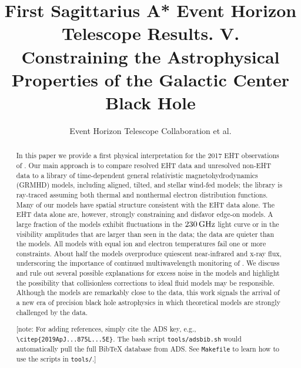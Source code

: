 \documentclass[twocolumn,twocolappendix,tighten,dvipsnames,linenumbers]{aastex63}
\newcommand\note[1]{{\color{OliveGreen}[note: #1]}}
\begin{document}
\title{First Sagittarius A* Event Horizon Telescope Results. V.\\
  Constraining the Astrophysical Properties of the Galactic Center Black Hole}

%
\author{Event Horizon Telescope Collaboration et al.}


\received{\today}
\revised{\today}

\begin{abstract}

In this paper we provide a first physical interpretation for the 2017
EHT observations of \sgra.
Our main approach is to compare resolved EHT data and unresolved
non-EHT data to a library of time-dependent general relativistic
magnetohydrodynamics (GRMHD) models, including aligned, tilted, and
stellar wind-fed models; the library is ray-traced assuming both
thermal and nonthermal electron distribution functions.
Many of our models have spatial structure consistent with the EHT data
alone.
The EHT data alone are, however, strongly constraining and disfavor
edge-on models.
A large fraction of the models exhibit fluctuations in the $230\,\mathrm{GHz}$
light curve or in the visibility amplitudes that are larger than seen
in the data; the data are quieter than the models.
All models with equal ion and electron temperatures fail one or more
constraints.
About half the models overproduce quiescent near-infrared and x-ray
flux, underscoring the importance of continued multiwavelength
monitoring of \sgra.
We discuss and rule out several possible explanations for excess noise
in the models and highlight the possibility that collisionless
corrections to ideal fluid models may be responsible.
Although the models are remarkably close to the data, this work
signals the arrival of a new era of precision black hole astrophysics
in which theoretical models are strongly challenged by the data.

\note{For adding references, simply cite the ADS key, e.g.,
  \texttt{\textbackslash citep\{2019ApJ...875L...5E\}}.
  The bash script \texttt{tools/adsbib.sh} would automatically pull
  the full BibTeX database from ADS.
  See \texttt{Makefile} to learn how to use the scripts in
  \texttt{tools/}.}
\end{abstract}
\end{document}
